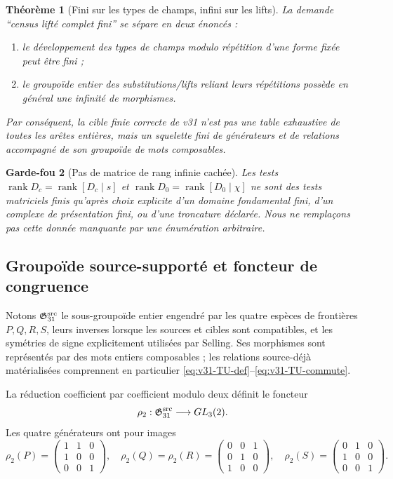 \documentclass[11pt,a4paper]{article}
\newtheorem{theorem}{Théorème}[section]
\newtheorem{guardrail}[theorem]{Garde-fou}
\newcommand{\rank}{\operatorname{rank}}
\begin{document}
\begin{theorem}[Fini sur les types de champs, infini sur les lifts]\label{thm:v31-finite-infinite}
La demande ``census lifté complet fini'' se sépare en deux énoncés :
\begin{enumerate}[label=\textup{(\roman*)}]
\item le développement des \emph{types de champs modulo répétition} d'une forme fixée peut être
fini ;
\item le groupoïde entier des substitutions/lifts reliant leurs répétitions possède en général une
infinité de morphismes.
\end{enumerate}
Par conséquent, la cible finie correcte de v31 n'est pas une table exhaustive de toutes les arêtes
entières, mais un squelette fini de générateurs et de relations accompagné de son groupoïde de
mots composables.
\end{theorem}

\begin{guardrail}[Pas de matrice de rang infinie cachée]
Les tests
$\rank D_c=\rank[D_c\mid s]$ et
$\rank D_0=\rank[D_0\mid\chi]$
ne sont des tests matriciels finis qu'après choix explicite d'un domaine fondamental fini, d'un
complexe de présentation fini, ou d'une troncature déclarée. Nous ne remplaçons pas cette donnée
manquante par une énumération arbitraire.
\end{guardrail}

\subsection{Groupoïde source-supporté et foncteur de congruence}

Notons $\mathfrak G_{31}^{\rm src}$ le sous-groupoïde entier engendré par les quatre espèces de
frontières $P,Q,R,S$, leurs inverses lorsque les sources et cibles sont compatibles, et les
symétries de signe explicitement utilisées par Selling. Ses morphismes sont représentés par des
mots entiers composables ; les relations source-déjà matérialisées comprennent en particulier
\eqref{eq:v31-TU-def}--\eqref{eq:v31-TU-commute}.

La réduction coefficient par coefficient modulo deux définit le foncteur
\begin{equation}\label{eq:v31-rho2}
 \rho_2:\mathfrak G_{31}^{\rm src}\longrightarrow GL_3(2).
\end{equation}
Les quatre générateurs ont pour images
\[
 \rho_2(P)=
 \begin{pmatrix}1&1&0\\1&0&0\\0&0&1\end{pmatrix},
 \quad
 \rho_2(Q)=\rho_2(R)=
 \begin{pmatrix}0&0&1\\0&1&0\\1&0&0\end{pmatrix},
 \quad
 \rho_2(S)=
 \begin{pmatrix}0&1&0\\1&0&0\\0&0&1\end{pmatrix}.
\]
\end{document}
